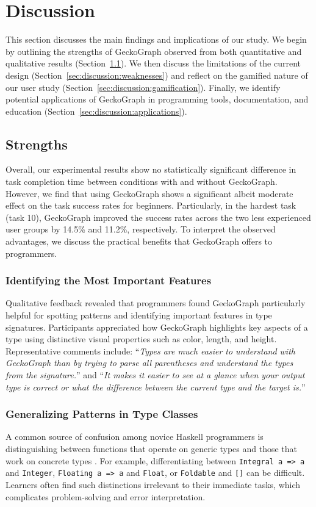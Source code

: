 \documentclass[preprint,12pt]{elsarticle}
\begin{document}
\section{Discussion} \label{sec:discussion}

This section discusses the main findings and implications of our study. 
We begin by outlining the strengths of GeckoGraph observed from both quantitative and qualitative results (Section~\ref{sec:discussion:strengths}). 
We then discuss the limitations of the current design (Section~\ref{sec:discussion:weaknesses}) and reflect on the gamified nature of our user study (Section~\ref{sec:discussion:gamification}). 
Finally, we identify potential applications of GeckoGraph in programming tools, documentation, and education (Section~\ref{sec:discussion:applications}).

\subsection{Strengths}\label{sec:discussion:strengths}
Overall, our experimental results show no statistically significant difference in task completion time between conditions with and without GeckoGraph. However, we find that using GeckoGraph shows a significant albeit moderate effect on the task success rates for beginners. Particularly, in the hardest task (task 10), GeckoGraph improved the success rates across the two less experienced user groups by 14.5\% and 11.2\%, respectively. 
To interpret the observed advantages, we discuss the practical benefits that GeckoGraph offers to programmers.

\subsubsection{Identifying the Most Important Features}
Qualitative feedback revealed that programmers found GeckoGraph particularly helpful for spotting patterns and identifying important features in type signatures. 
Participants appreciated how GeckoGraph highlights key aspects of a type using distinctive visual properties such as color, length, and height. 
Representative comments include: 
``{\it Types are much easier to understand with GeckoGraph than by trying to parse all parentheses and understand the types from the signature.}'' and 
``{\it It makes it easier to see at a glance when your output type is correct or what the difference between the current type and the target is.}''

\subsubsection{Generalizing Patterns in Type Classes}
A common source of confusion among novice Haskell programmers is distinguishing between functions that operate on generic types and those that work on concrete types \cite{Tirronen2015-nr}. 
For example, differentiating between {\tt Integral a => a} and {\tt Integer}, {\tt Floating a => a} and {\tt Float}, or {\tt Foldable} and {\tt []} can be difficult. 
Learners often find such distinctions irrelevant to their immediate tasks, which complicates problem-solving and error interpretation.
\end{document}
